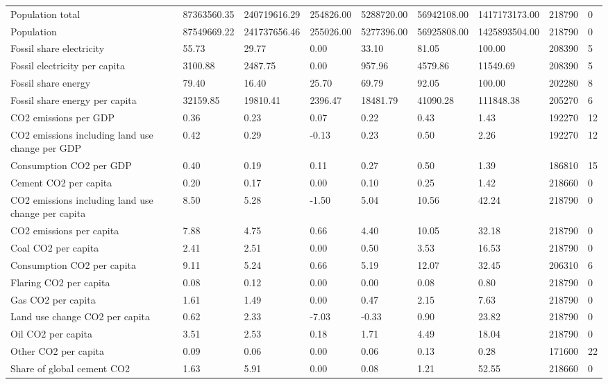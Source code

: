 \begin{longtable}{lllllllll}
Population total & 87363560.35 & 240719616.29 & 254826.00 & 5288720.00 & 56942108.00 & 1417173173.00 & 218790 & 0\\
Population & 87549669.22 & 241737656.46 & 255026.00 & 5277396.00 & 56925808.00 & 1425893504.00 & 218790 & 0\\
Fossil share electricity & 55.73 & 29.77 & 0.00 & 33.10 & 81.05 & 100.00 & 208390 & 5\\
\addlinespace
Fossil electricity per capita & 3100.88 & 2487.75 & 0.00 & 957.96 & 4579.86 & 11549.69 & 208390 & 5\\
Fossil share energy & 79.40 & 16.40 & 25.70 & 69.79 & 92.05 & 100.00 & 202280 & 8\\
Fossil share energy per capita & 32159.85 & 19810.41 & 2396.47 & 18481.79 & 41090.28 & 111848.38 & 205270 & 6\\
CO2 emissions per GDP & 0.36 & 0.23 & 0.07 & 0.22 & 0.43 & 1.43 & 192270 & 12\\
CO2 emissions including land use change per GDP & 0.42 & 0.29 & -0.13 & 0.23 & 0.50 & 2.26 & 192270 & 12\\
\addlinespace
Consumption CO2 per GDP & 0.40 & 0.19 & 0.11 & 0.27 & 0.50 & 1.39 & 186810 & 15\\
Cement CO2 per capita & 0.20 & 0.17 & 0.00 & 0.10 & 0.25 & 1.42 & 218660 & 0\\
CO2 emissions including land use change per capita & 8.50 & 5.28 & -1.50 & 5.04 & 10.56 & 42.24 & 218790 & 0\\
CO2 emissions per capita & 7.88 & 4.75 & 0.66 & 4.40 & 10.05 & 32.18 & 218790 & 0\\
Coal CO2 per capita & 2.41 & 2.51 & 0.00 & 0.50 & 3.53 & 16.53 & 218790 & 0\\
\addlinespace
Consumption CO2 per capita & 9.11 & 5.24 & 0.66 & 5.19 & 12.07 & 32.45 & 206310 & 6\\
Flaring CO2 per capita & 0.08 & 0.12 & 0.00 & 0.00 & 0.08 & 0.80 & 218790 & 0\\
Gas CO2 per capita & 1.61 & 1.49 & 0.00 & 0.47 & 2.15 & 7.63 & 218790 & 0\\
Land use change CO2 per capita & 0.62 & 2.33 & -7.03 & -0.33 & 0.90 & 23.82 & 218790 & 0\\
Oil CO2 per capita & 3.51 & 2.53 & 0.18 & 1.71 & 4.49 & 18.04 & 218790 & 0\\
\addlinespace
Other CO2 per capita & 0.09 & 0.06 & 0.00 & 0.06 & 0.13 & 0.28 & 171600 & 22\\
Share of global cement CO2 & 1.63 & 5.91 & 0.00 & 0.08 & 1.21 & 52.55 & 218660 & 0\\

\end{longtable}
